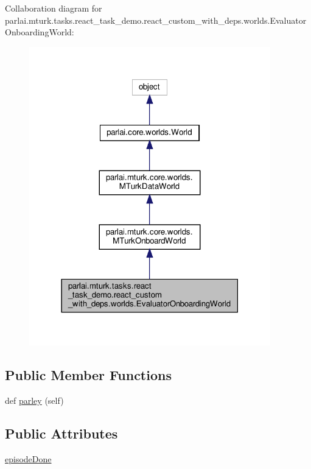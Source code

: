 Collaboration diagram for parlai.\+mturk.\+tasks.\+react\+\_\+task\+\_\+demo.\+react\+\_\+custom\+\_\+with\+\_\+deps.\+worlds.\+Evaluator\+Onboarding\+World\+:
\nopagebreak
\begin{figure}[H]
\begin{center}
\leavevmode
\includegraphics[width=297pt]{classparlai_1_1mturk_1_1tasks_1_1react__task__demo_1_1react__custom__with__deps_1_1worlds_1_1Evab0a9115f2acbeba1feacae030e5aad02}
\end{center}
\end{figure}
\subsection*{Public Member Functions}
\begin{DoxyCompactItemize}
\item 
def \hyperlink{classparlai_1_1mturk_1_1tasks_1_1react__task__demo_1_1react__custom__with__deps_1_1worlds_1_1EvaluatorOnboardingWorld_a9e0547ae8f135a802327acff08c8a785}{parley} (self)
\end{DoxyCompactItemize}
\subsection*{Public Attributes}
\begin{DoxyCompactItemize}
\item 
\hyperlink{classparlai_1_1mturk_1_1tasks_1_1react__task__demo_1_1react__custom__with__deps_1_1worlds_1_1EvaluatorOnboardingWorld_aef584724f08f16a7b6dcc3cae22bbad5}{episode\+Done}
\end{DoxyCompactItemize}


